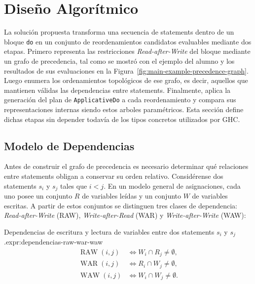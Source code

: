 
\section{Diseño Algorítmico}
\label{sec:solucion-diseno}

La solución propuesta transforma una secuencia de statements dentro de un bloque \texttt{do} en un conjunto de reordenamientos candidatos evaluables mediante dos etapas. Primero representa las restricciones \textit{Read-after-Write} del bloque mediante un grafo de precedencia, tal como se mostró con el ejemplo del alumno y los resultados de sus evaluaciones en la Figura~\ref{fig:main-example-precedence-graph}. Luego enumera los ordenamientos topológicos de ese grafo, es decir, aquellos que mantienen válidas las dependencias entre statements. Finalmente, aplica la generación del plan de \texttt{ApplicativeDo} a cada reordenamiento y compara sus representaciones internas siendo estos arboles paramétricos. Esta sección define dichas etapas sin depender todavía de los tipos concretos utilizados por \textsf{GHC}.

\subsection{Modelo de Dependencias}
\label{sec:solucion-modelo-dependencias}

Antes de construir el grafo de precedencia es necesario determinar qué relaciones entre statements obligan a conservar su orden relativo. Considérense dos statements $s_i$ y $s_j$ tales que $i<j$. En un modelo general de asignaciones, cada uno posee un conjunto $R$ de variables leídas y un conjunto $W$ de variables escritas. A partir de estos conjuntos se distinguen tres clases de dependencia: \textit{Read-after-Write} (RAW), \textit{Write-after-Read} (WAR) y \textit{Write-after-Write} (WAW):

\begin{ReportExpression}{Dependencias de escritura y lectura de variables entre dos statements $s_i$ y $s_j$.}{expr:dependencias-raw-war-waw}
\[
\begin{aligned}
\operatorname{RAW}(i,j) &\iff W_i\cap R_j\neq\emptyset,\\
\operatorname{WAR}(i,j) &\iff R_i\cap W_j\neq\emptyset,\\
\operatorname{WAW}(i,j) &\iff W_i\cap W_j\neq\emptyset.
\end{aligned}
\]
\end{ReportExpression}

